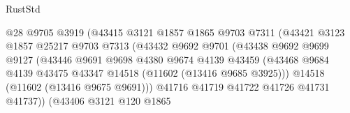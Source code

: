 \begin{lexlean}{RustStd}
\begin{coremodule}
                                        @28
                                        @9705
                                        @3919
                                        (@43415
                                          @3121
                                          @1857
                                          @1865
                                          @9703
                                          @7311
                                          (@43421
                                            @3123
                                            @1857
                                            @25217
                                            @9703
                                            @7313
                                            (@43432
                                              @9692
                                              @9701
                                              (@43438
                                                @9692
                                                @9699
                                                @9127
                                                (@43446
                                                  @9691
                                                  @9698
                                                  @4380
                                                  @9674
                                                  @4139
                                                  @43459
                                                  (@43468
                                                    @9684
                                                    @4139
                                                    @43475
                                                    @43347
                                                    @14518
                                                    (@11602 (@13416 @9685 @3925)))
                                                  @14518
                                                  (@11602 (@13416 @9675 @9691)))
                                                @41716
                                                @41719
                                                @41722
                                                @41726
                                                @41731
                                                @41737))
                                            (@43406
                                              @3121
                                              @120
                                              @1865

\end{coremodule}
\end{lexlean}
